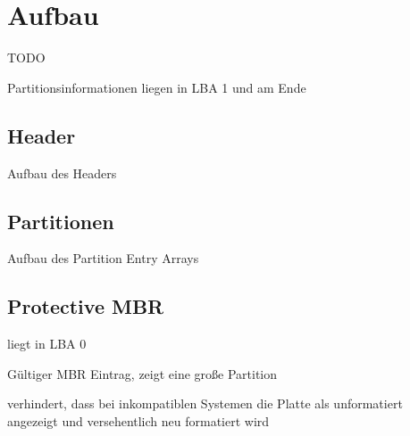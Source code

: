 \section{Aufbau}
TODO

Partitionsinformationen liegen in LBA 1 und am Ende

\subsection{Header}
Aufbau des Headers

\subsection{Partitionen}
Aufbau des Partition Entry Arrays

\subsection{Protective MBR}
liegt in LBA 0

Gültiger MBR Eintrag, zeigt eine große Partition

verhindert, dass bei inkompatiblen Systemen die Platte als unformatiert angezeigt und versehentlich neu formatiert wird
